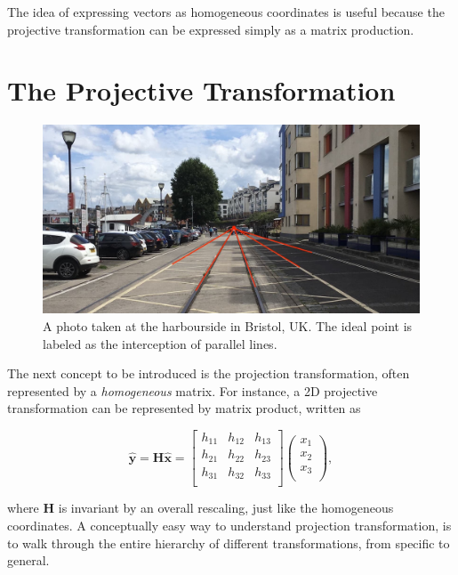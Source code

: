 \documentclass[11pt,twoside]{report}
\begin{document}
 The idea of expressing vectors as homogeneous coordinates is useful because the projective transformation can be expressed simply as a matrix production.
 
 \section{The Projective Transformation}
 
 \begin{figure}
  \includegraphics[width=\linewidth,outer]{ideal-point.jpg}
  \caption[An ideal point in Bristol harbourside]{A photo taken at the harbourside in Bristol, UK. The ideal point is labeled as the interception of parallel lines.}
  \label{fig:ideal-point}
\end{figure}
 
The next concept to be introduced is the projection transformation, often represented by a \emph{homogeneous} matrix. For instance, a 2D projective transformation can be represented by matrix product, written as

$$
\hat{\mathbf{y}} = \mathbf{H} \hat{\mathbf{x}} = 
\left[
\begin{matrix}
	h_{11} & h_{12} & h_{13}\\
	h_{21} & h_{22} & h_{23}\\
	h_{31} & h_{32} & h_{33}\\
\end{matrix}
\right]
\left(
\begin{matrix}
	x_{1}\\ x_{2}\\ x_{3}\\
\end{matrix}
\right),
$$

\noindent where $\mathbf{H}$ is invariant by an overall rescaling, just like the homogeneous coordinates. A conceptually easy way to understand projection transformation, is to walk through the entire hierarchy of different transformations, from specific to general.
 
\end{document}
